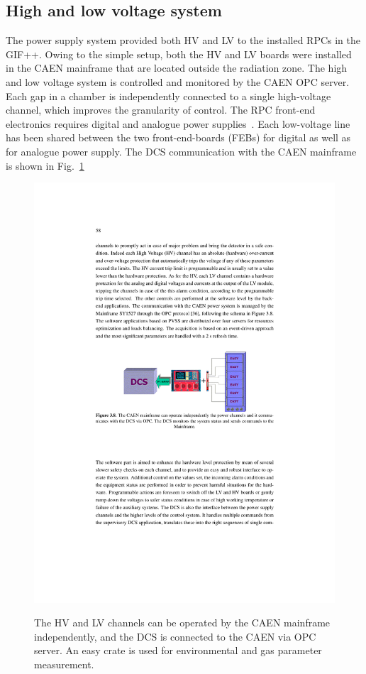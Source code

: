 \subsection{High and low voltage system}
The power supply system provided both HV and LV to the installed RPCs in the GIF++. Owing to the simple setup, both the HV and LV boards were installed in the CAEN mainframe that are located outside the radiation zone.
The high and low voltage system is controlled and monitored by the CAEN OPC server. Each gap in a chamber is independently connected to a single high-voltage channel, which improves the granularity of control. The RPC front-end electronics requires digital and analogue power supplies~\cite{feb}. Each low-voltage line has been shared between the two front-end-boards (FEBs) for digital as well as for analogue power supply. The DCS communication with the CAEN mainframe is shown in Fig.~\ref{fig:caen_control}
\begin{figure}[h]
\centering
\includegraphics[scale=1.0,trim=60 380 60 320,clip]{fig/wincc/caen_control.pdf}\\
 \caption{The HV and LV channels can be operated by the CAEN mainframe independently, and the DCS is connected to the CAEN via OPC server. An easy crate is used for environmental and gas parameter measurement.}
\label{fig:caen_control}
\end{figure}
